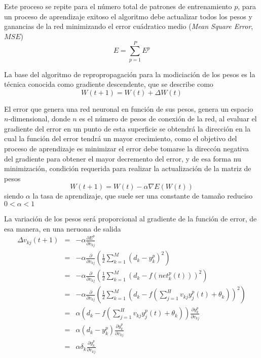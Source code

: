 Este proceso se repite para el número total de patrones de entrenamiento $p$, para un proceso de aprendizaje exitoso el algoritmo debe actualizar todos los pesos y ganancias de la red minimizando el error cuádratico medio ({\em Mean Square Error}, $MSE$) $$ E = \sum_{p = 1}^{P} E^{p} $$

La base del algoritmo de repropropagación para la modiciación de los pesos es la técnica conocida como gradiente descendente, que se describe como $$ W(t + 1) = W(t) + \Delta W(t) $$

El error que genera una red neuronal en función de sus pesos, genera un espacio $n$-dimensional, donde $n$ es el número de pesos de conexión de la red, al evaluar el gradiente del error en un punto de esta superficie se obtendrá la dirección en la cual la función del error tendrá un mayor crecimiento, como el objetivo del proceso de aprendizaje es minimizar el error debe tomarse la direccón negativa del gradiente para obtener el mayor decremento del error, y de esa forma nu minimización, condición requerida para realizar la actualización de la matriz de pesos $$ W(t + 1) = W(t) - \alpha\nabla E( W(t)) $$ siendo $\alpha$ la tasa de aprendizaje, que suele ser una constante de tamaño reduciso $0 < \alpha < 1$

La variación de los pesos será proporcional al gradiente de la función de error, de esa manera, en una neruona de salida
\begin{eqnarray*}
	\Delta v_{kj}(t + 1)	&=& -\alpha\frac{\partial E^{p}}{\partial v_{kj}}\\
							&=& -\alpha\frac{\partial}{\partial v_{kj}}\left(\frac{1}{2}\sum_{k = 1}^{M}(d_{k} - y_{k}^{p})^2\right)\\
							&=& -\alpha\frac{\partial}{\partial v_{kj}}\left(\frac{1}{2}\sum_{k = 1}^{M}(d_{k} - f(net_{k}^{p}(t)))^2\right)\\
							&=& -\alpha\frac{\partial}{\partial v_{kj}}\left(\frac{1}{2}\sum_{k = 1}^{M}\left(d_{k} - f\left(\sum_{j = 1}^{H}v_{kj}y_{j}^{p}(t) + \theta_{k}\right)\right)^2\right)\\
							&=& \alpha\left(d_{k} - f\left(\sum_{j = 1}^{H}v_{kj}y_{j}^{p}(t) + \theta_{k}\right)\right)\frac{\partial y_{k}^{p}}{\partial v_{kj}}\\
							&=& \alpha(d_{k} - y_{k}^{p})\frac{\partial y_{k}^{p}}{\partial v_{kj}}\\
							&=& \alpha\delta_{k}\frac{\partial y_{k}^{p}}{\partial v_{kj}}
\end{eqnarray*}

